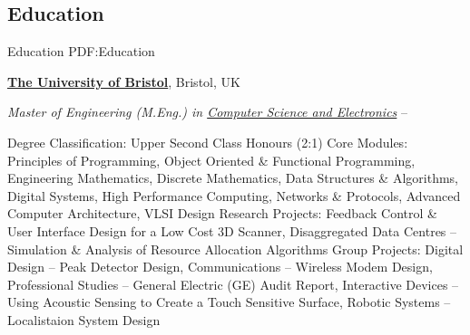 \documentclass[a4paper,10pt,oneside]{article}
\begin{document}
\begin{body}


\section
{Education}
{Education}
{PDF:Education}

\href{http://www.bristol.ac.uk/}
{\textbf{The University of Bristol}},
Bristol, UK

\EntryGapNoBreak
\textit{Master of Engineering (M.Eng.) in
\href{http://www.bristol.ac.uk/engineering/departments/eeng/}
{Computer Science and Electronics}}
\hfill
{} --
\begin{detail}
\BulletItem
Degree Classification: Upper Second Class Honours (2:1)
\BulletItem
Core Modules: Principles of Programming, Object Oriented \& Functional Programming, Engineering Mathematics, Discrete Mathematics, Data Structures \& Algorithms, Digital Systems, High Performance Computing, Networks \& Protocols, Advanced Computer Architecture, VLSI Design
\BulletItem
Research Projects: Feedback Control \& User Interface Design for a Low Cost 3D Scanner, Disaggregated Data Centres -- Simulation \& Analysis of Resource Allocation Algorithms
\BulletItem
Group Projects: Digital Design -- Peak Detector Design, Communications -- Wireless Modem Design, Professional Studies -- General Electric (GE) Audit Report, Interactive Devices -- Using Acoustic Sensing to Create a Touch Sensitive Surface, Robotic Systems -- Localistaion System Design
\end{detail}


\end{body}
\end{document}

